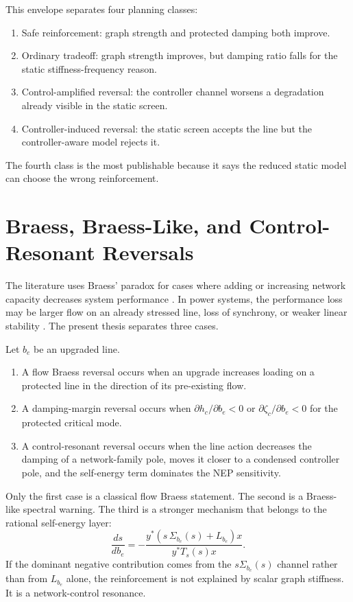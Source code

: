 This envelope separates four planning classes:
\begin{enumerate}
\item Safe reinforcement: graph strength and protected damping both improve.
\item Ordinary tradeoff: graph strength improves, but damping ratio falls for
the static stiffness-frequency reason.
\item Control-amplified reversal: the controller channel worsens a degradation
already visible in the static screen.
\item Controller-induced reversal: the static screen accepts the line but the
controller-aware model rejects it.
\end{enumerate}
The fourth class is the most publishable because it says the reduced static
model can choose the wrong reinforcement.

\section{Braess, Braess-Like, and Control-Resonant Reversals}

The literature uses Braess' paradox for cases where adding or increasing
network capacity decreases system performance
\cite{braess2005traffic,schafer2022braess}. In power systems, the performance
loss may be larger flow on an already stressed line, loss of synchrony, or
weaker linear stability \cite{witthaut2012braess,coletta2016braess}. The
present thesis separates three cases.

\begin{definition}
Let \(b_e\) be an upgraded line.
\begin{enumerate}
\item A flow Braess reversal occurs when an upgrade increases loading on a
protected line in the direction of its pre-existing flow.
\item A damping-margin reversal occurs when
\(\partial h_c/\partial b_e<0\) or
\(\partial\zeta_c/\partial b_e<0\) for the protected critical mode.
\item A control-resonant reversal occurs when the line action decreases the
damping of a network-family pole, moves it closer to a condensed controller
pole, and the self-energy term dominates the NEP sensitivity.
\end{enumerate}
\end{definition}

Only the first case is a classical flow Braess statement. The second is a
Braess-like spectral warning. The third is a stronger mechanism that belongs
to the rational self-energy layer:
\begin{equation}
  \frac{ds}{db_e}
  =
  -
  \frac{
  y^*\left(s\,\Sigma_{b_e}(s)+L_{b_e}\right)x
  }{
  y^*T_s(s)x
  }.
  \label{eq:control_resonant_line_sensitivity}
\end{equation}
If the dominant negative contribution comes from the \(s\Sigma_{b_e}(s)\)
channel rather than from \(L_{b_e}\) alone, the reinforcement is not explained
by scalar graph stiffness. It is a network-control resonance.

